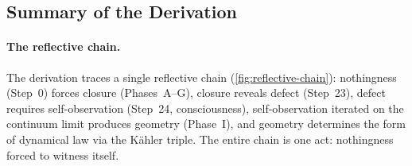 

\subsection{Summary of the Derivation}
\label{sec:derivation:summary}

\paragraph{The reflective chain.}
The derivation traces a single reflective chain
(\cref{fig:reflective-chain}): nothingness (Step~0) forces
closure (Phases~A--G), closure reveals defect (Step~23), defect requires
self-observation (Step~24, consciousness), self-observation iterated on the
continuum limit produces geometry (Phase~I), and geometry determines the
form of dynamical law via the K\"{a}hler triple.  The entire chain is one
act: nothingness forced to witness itself.



